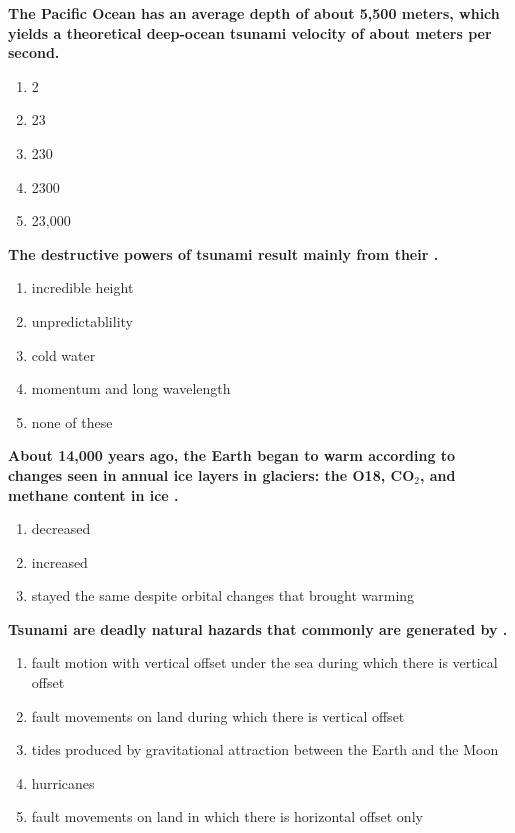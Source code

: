 \item {
\setlength{\itemsep}{0cm}
\setlength{\parskip}{.2cm}
\begin{samepage}
\textbf{
The Pacific Ocean has an average depth of about 5,500 meters, which yields a theoretical deep-ocean tsunami velocity of about \makebox[1cm]{\Rivpt\hrulefill\Rivpt} meters per second.
}
\begin{enumerate}
\item { 	2 }
\item { 	23 }
\item { 	230 }
\item { 	2300 }
\item { 	23,000 		 }
\end{enumerate}
\end{samepage}
}
\item {
\setlength{\itemsep}{0cm}
\setlength{\parskip}{.2cm}
\begin{samepage}
\textbf{
The destructive powers of tsunami result mainly from their \makebox[1cm]{\Rivpt\hrulefill\Rivpt}.
}
\begin{enumerate}
\item { 	incredible height }
\item { 	unpredictablility }
\item { 	cold water }
\item { 	momentum and long wavelength }
\item { 	none of these 		 }
\end{enumerate}
\end{samepage}
}
\item {
\setlength{\itemsep}{0cm}
\setlength{\parskip}{.2cm}
\begin{samepage}
\textbf{
About 14,000 years ago, the Earth began to warm according to changes seen in annual ice layers in glaciers: the O18, CO\ensuremath{_2}, and methane content in ice \makebox[1cm]{\Rivpt\hrulefill\Rivpt}.
}
\begin{enumerate}
\item {  decreased }
\item {  increased }
\item {  stayed the same despite orbital changes that brought warming }
\end{enumerate}
\end{samepage}
}
\item {
\setlength{\itemsep}{0cm}
\setlength{\parskip}{.2cm}
\begin{samepage}
\textbf{
Tsunami are deadly natural hazards that commonly are generated by \makebox[1cm]{\Rivpt\hrulefill\Rivpt}.
}
\begin{enumerate}
\item { 	fault motion with vertical offset under the sea during which there is vertical offset }
\item { 	fault movements on land during which there is vertical offset }
\item { 	tides produced by gravitational attraction between the Earth and the Moon }
\item { 	hurricanes }
\item { 	fault movements on land in which there is horizontal offset only 		 }
\end{enumerate}
\end{samepage}
}
